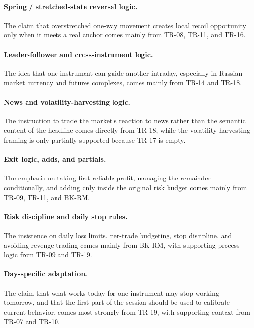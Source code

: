 \paragraph{Spring / stretched-state reversal logic.}
The claim that overstretched one-way movement creates local recoil opportunity only when it meets a real anchor comes mainly from TR-08, TR-11, and TR-16.

\paragraph{Leader-follower and cross-instrument logic.}
The idea that one instrument can guide another intraday, especially in Russian-market currency and futures complexes, comes mainly from TR-14 and TR-18.

\paragraph{News and volatility-harvesting logic.}
The instruction to trade the market's reaction to news rather than the semantic content of the headline comes directly from TR-18, while the volatility-harvesting framing is only partially supported because TR-17 is empty.

\paragraph{Exit logic, adds, and partials.}
The emphasis on taking first reliable profit, managing the remainder conditionally, and adding only inside the original risk budget comes mainly from TR-09, TR-11, and BK-RM.

\paragraph{Risk discipline and daily stop rules.}
The insistence on daily loss limits, per-trade budgeting, stop discipline, and avoiding revenge trading comes mainly from BK-RM, with supporting process logic from TR-09 and TR-19.

\paragraph{Day-specific adaptation.}
The claim that what works today for one instrument may stop working tomorrow, and that the first part of the session should be used to calibrate current behavior, comes most strongly from TR-19, with supporting context from TR-07 and TR-10.

